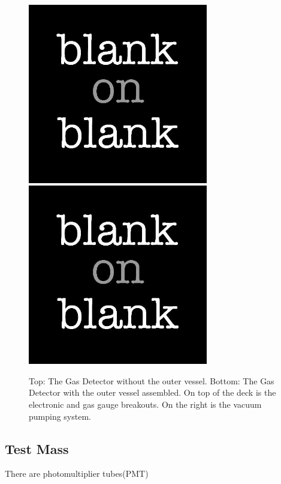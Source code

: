 \begin{figure}[!ht]
  \centering
  \includegraphics[width=0.7\textwidth]
  {blank.jpg}
  \includegraphics[width=0.7\textwidth]
  {blank.jpg}
  \caption{Top: The Gas Detector without the outer vessel. Bottom: The Gas Detector with the outer vessel assembled. On top of the deck is the electronic and gas gauge breakouts. On the right is the vacuum pumping system.}
  \label{fig: chamber general}
\end{figure}

\subsection{Test Mass}
There are  photomultiplier tubes(PMT)

\bigskip

